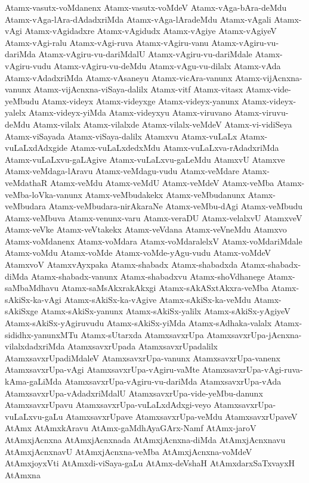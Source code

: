 {Atamx-vasutx-voMdanenx
Atamx-vasutx-voMdeV
Atamx-vAga-bAra-deMdu
Atamx-vAga-lAra-dAdadxriMda
Atamx-vAga-lAradeMdu
Atamx-vAgali
Atamx-vAgi
Atamx-vAgidadxre
Atamx-vAgidudx
Atamx-vAgiye
Atamx-vAgiyeV
Atamx-vAgi-ralu
Atamx-vAgi-ruva
Atamx-vAgiru-vanu
Atamx-vAgiru-vu-dariMda
Atamx-vAgiru-vu-dariMdalU
Atamx-vAgiru-vu-dariMdale
Atamx-vAgiru-vudu
Atamx-vAgiru-vu-deMdu
Atamx-vAgu-vu-dilalx
Atamx-vAda
Atamx-vAdadxriMda
Atamx-vAsaneyu
Atamx-vicAra-vanunx
Atamx-vijAcnxna-vanunx
Atamx-vijAcnxna-viSaya-dalilx
Atamx-vitf
Atamx-vitasx
Atamx-vide-yeMbudu
Atamx-videyx
Atamx-videyxge
Atamx-videyx-yanunx
Atamx-videyx-yalelx
Atamx-videyx-yiMda
Atamx-videyxyu
Atamx-viruvano
Atamx-viruvu-deMdu
Atamx-vilalx
Atamx-vilalxde
Atamx-vilalx-veMdeV
Atamx-vi-vidiSeya
Atamx-viSayada
Atamx-viSaya-dalilx
Atamxvu
Atamx-vuLaLx
Atamx-vuLaLxdAdxgide
Atamx-vuLaLxdedxMdu
Atamx-vuLaLxva-rAdadxriMda
Atamx-vuLaLxvu-gaLAgive
Atamx-vuLaLxvu-gaLeMdu
AtamxvU
Atamxve
Atamx-veMdaga-lAravu
Atamx-veMdagu-vudu
Atamx-veMdare
Atamx-veMdathaR
Atamx-veMdu
Atamx-veMdU
Atamx-veMdeV
Atamx-veMba
Atamx-veMba-loVka-vanunx
Atamx-veMbudakekx
Atamx-veMbudanunx
Atamx-veMbudara
Atamx-veMbudara-nirAkaraNe
Atamx-veMbu-dAgi
Atamx-veMbudu
Atamx-veMbuva
Atamx-venunx-varu
Atamx-veraDU
Atamx-velalxvU
AtamxveV
Atamx-veVke
Atamx-veVtakekx
Atamx-veVdana
Atamx-veVneMdu
Atamxvo
Atamx-voMdanenx
Atamx-voMdara
Atamx-voMdaralelxV
Atamx-voMdariMdale
Atamx-voMdu
Atamx-voMde
Atamx-voMde-yAgu-vudu
Atamx-voMdeV
AtamxvoV
AtamxvAyxpaka
Atamx-shabadx
Atamx-shabadxda
Atamx-shabadx-diMda
Atamx-shabadx-vanunx
Atamx-shabadxvu
Atamx-shoVdhanege
Atamx-saMbaMdhavu
Atamx-saMsAkxrakAkxgi
Atamx-sAkASxtAkxra-veMba
Atamx-sAkiSx-ka-vAgi
Atamx-sAkiSx-ka-vAgive
Atamx-sAkiSx-ka-veMdu
Atamx-sAkiSxge
Atamx-sAkiSx-yanunx
Atamx-sAkiSx-yalilx
Atamx-sAkiSx-yAgiyeV
Atamx-sAkiSx-yAgiruvudu
Atamx-sAkiSx-yiMda
Atamx-sAdhaka-valalx
Atamx-sididhx-yanunxMTu
Atamx-sUtarxda
AtamxsavxrUpa
AtamxsavxrUpa-jAcnxna-vilalxdadxriMda
AtamxsavxrUpada
AtamxsavxrUpadalilx
AtamxsavxrUpadiMdaleV
AtamxsavxrUpa-vanunx
AtamxsavxrUpa-vanenx
AtamxsavxrUpa-vAgi
AtamxsavxrUpa-vAgiru-vaMte
AtamxsavxrUpa-vAgi-ruva-kAma-gaLiMda
AtamxsavxrUpa-vAgiru-vu-dariMda
AtamxsavxrUpa-vAda
AtamxsavxrUpa-vAdadxriMdalU
AtamxsavxrUpa-vide-yeMbu-danunx
AtamxsavxrUpavu
AtamxsavxrUpa-vuLaLxdAdxgi-veyo
AtamxsavxrUpa-vuLaLxvu-gaLu
AtamxsavxrUpave
AtamxsavxrUpa-veMdu
AtamxsavxrUpaveV
AtAmx
AtAmxkAravu
AtAmx-gaMdhAyaGArx-Namf
AtAmx-jaroV
AtAmxjAcnxna
AtAmxjAcnxnada
AtAmxjAcnxna-diMda
AtAmxjAcnxnavu
AtAmxjAcnxnavU
AtAmxjAcnxna-veMba
AtAmxjAcnxna-voMdeV
AtAmxjoyxVti
AtAmxdi-viSaya-gaLu
AtAmx-deVshaH
AtAmxdarxSaTxvayxH
AtAmxna
}
